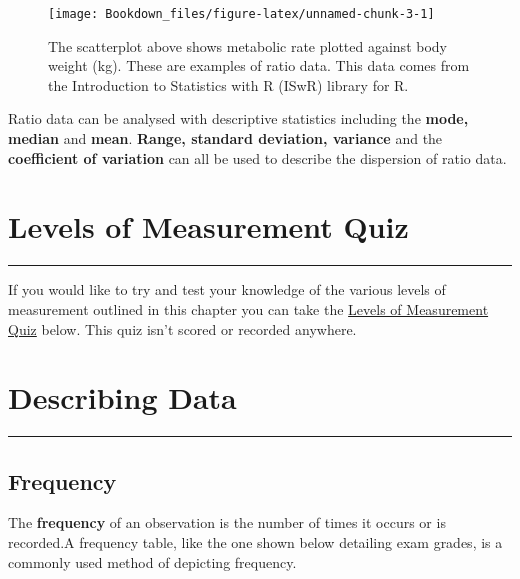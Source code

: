\documentclass[
]{book}
\begin{document}
\begin{figure}

{\centering \texttt{[image: Bookdown\_files/figure-latex/unnamed-chunk-3-1]} 

}

\caption{The scatterplot above shows metabolic rate plotted against body weight (kg). These are examples of ratio data. This data comes from the Introduction to Statistics with R (ISwR) library for R.}\label{fig:unnamed-chunk-3}
\end{figure}

Ratio data can be analysed with descriptive statistics including the \textbf{mode, median} and \textbf{mean}. \textbf{Range, standard deviation, variance} and the \textbf{coefficient of variation} can all be used to describe the dispersion of ratio data.

\hypertarget{levels-of-measurement-quiz}{%
\chapter{Levels of Measurement Quiz}\label{levels-of-measurement-quiz}}

\begin{center}\rule{0.5\linewidth}{0.5pt}\end{center}

If you would like to try and test your knowledge of the various levels of measurement outlined in this chapter you can take the \href{https://view.genial.ly/62867083cd8fd700184ca06f/presentation-quiz}{Levels of Measurement Quiz} below. This quiz isn't scored or recorded anywhere.

\hypertarget{describing-data}{%
\chapter{Describing Data}\label{describing-data}}

\begin{center}\rule{0.5\linewidth}{0.5pt}\end{center}

\hypertarget{frequency}{%
\section{Frequency}\label{frequency}}

The \textbf{frequency} of an observation is the number of times it occurs or is recorded.A frequency table, like the one shown below detailing exam grades, is a commonly used method of depicting frequency.
\end{document}
